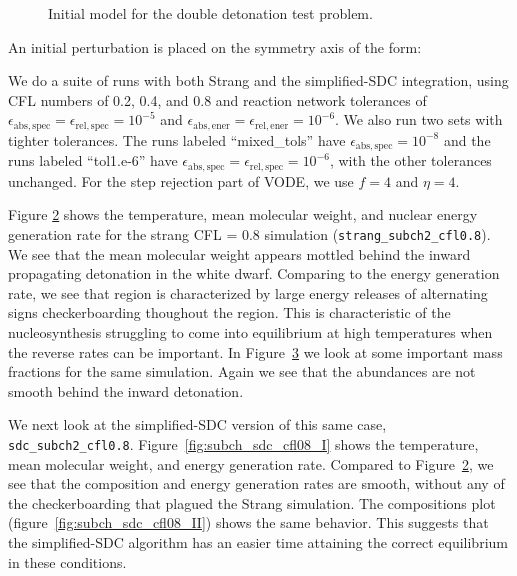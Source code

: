 \documentclass[times,preprint]{aastex63}
\newcommand{\atolspec}{{\epsilon_\mathrm{abs,spec}}}
\newcommand{\rtolspec}{{\epsilon_\mathrm{rel,spec}}}
\newcommand{\atolener}{{\epsilon_\mathrm{abs,ener}}}
\newcommand{\rtolener}{{\epsilon_\mathrm{rel,ener}}}
\begin{document}
\begin{figure}[t]
\centering
{}
\caption{\label{fig:subch_initial_model} Initial model for the double detonation test problem.}
\end{figure}

An initial perturbation is placed on the symmetry axis of the form:


We do a suite of runs with both Strang and the simplified-SDC
integration, using CFL numbers of 0.2, 0.4, and 0.8 and reaction
network tolerances of $\atolspec = \rtolspec = 10^{-5}$ and $\atolener
= \rtolener = 10^{-6}$.  We also run two sets with tighter tolerances.
The runs labeled ``mixed\_tols'' have $\atolspec = 10^{-8}$ and the
runs labeled ``tol1.e-6'' have $\atolspec = \rtolspec = 10^{-6}$, with
the other tolerances unchanged.  For the step rejection part of VODE,
we use $f = 4$ and $\eta = 4$.

Figure \ref{fig:subch_strang_cfl08_I} shows the temperature, mean
molecular weight, and nuclear energy generation rate for the strang
CFL = 0.8 simulation ({\tt strang\_subch2\_cfl0.8}).  We see that the
mean molecular weight appears mottled behind the inward propagating
detonation in the white dwarf.  Comparing to the energy generation
rate, we see that region is characterized by large energy releases of
alternating signs checkerboarding thoughout the region.  This is
characteristic of the nucleosynthesis struggling to come into
equilibrium at high temperatures when the reverse rates can be
important.  In Figure~\ref{fig:subch_strang_cfl08_II} we look at some
important mass fractions for the same simulation.  Again we see that
the abundances are not smooth behind the inward detonation.

\begin{figure}
\centering
{}
\caption{\label{fig:subch_strang_cfl08_I}}
\end{figure}

\begin{figure}
\centering
{}
\caption{\label{fig:subch_strang_cfl08_II}}
\end{figure}

We next look at the simplified-SDC version of this same case, {\tt
  sdc\_subch2\_cfl0.8}.  Figure~\ref{fig:subch_sdc_cfl08_I} shows the
temperature, mean molecular weight, and energy generation rate.
Compared to Figure~\ref{fig:subch_strang_cfl08_I}, we see that the
composition and energy generation rates are smooth, without any of the
checkerboarding that plagued the Strang simulation.  The compositions
plot (figure~\ref{fig:subch_sdc_cfl08_II}) shows the same behavior.
This suggests that the simplified-SDC algorithm has an easier time
attaining the correct equilibrium in these conditions.
\end{document}
